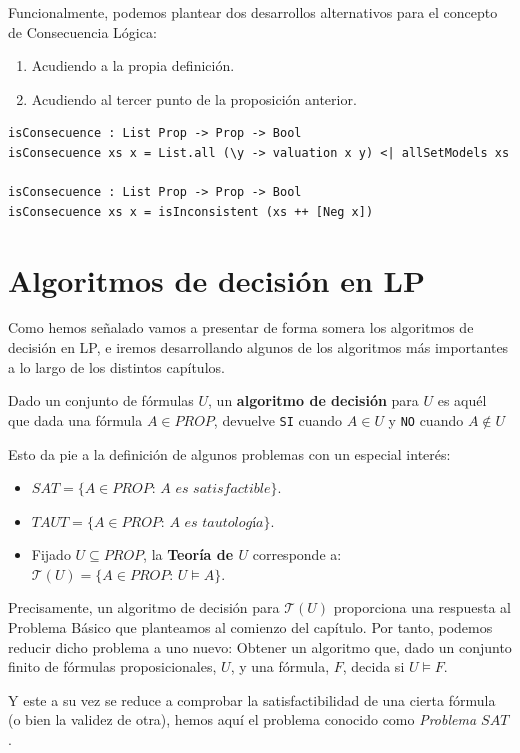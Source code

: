\documentclass[a4paper]{report}
\begin{document}
Funcionalmente, podemos plantear dos desarrollos alternativos para el concepto de Consecuencia Lógica:
\begin{enumerate}
\setlength{\leftskip}{0.5cm}
\item Acudiendo a la propia definición.
\item Acudiendo al tercer punto de la proposición anterior.
\end{enumerate}

\begin{lstlisting}[caption={Consecuencia Lógica}]
isConsecuence : List Prop -> Prop -> Bool
isConsecuence xs x = List.all (\y -> valuation x y) <| allSetModels xs

isConsecuence : List Prop -> Prop -> Bool
isConsecuence xs x = isInconsistent (xs ++ [Neg x])
\end{lstlisting}

\section{Algoritmos de decisión en LP}

Como hemos señalado vamos a presentar de forma somera los algoritmos de decisión en LP, e iremos desarrollando algunos de los algoritmos más importantes a lo largo de los distintos capítulos.

Dado un conjunto de fórmulas $U$, un \textbf{algoritmo de decisión} para $U$ es aquél que dada una fórmula $A \in PROP$, devuelve \texttt{SI} cuando $A \in U$ y \texttt{NO} cuando $A \not\in U$

Esto da pie a la definición de algunos problemas con un especial interés:
\begin{itemize}
\item $SAT = \{A \in PROP: \, A \textit{ es satisfactible}\}$.
\item $TAUT = \{A \in PROP: \, A \textit{ es tautología}\}$.
\item Fijado $U \subseteq PROP$, la \textbf{Teoría de $U$} corresponde a: $\mathcal{T}(U) = \{A \in PROP: \, U \models A\}$. 
\end{itemize}

Precisamente, un algoritmo de decisión para $\mathcal{T}(U)$ proporciona una respuesta al Problema Básico que planteamos al comienzo del capítulo. Por tanto, podemos reducir dicho problema a uno nuevo: Obtener un algoritmo que, dado un conjunto finito de fórmulas proposicionales, $U$, y una fórmula, $F$, decida si $U \models F$.

Y este a su vez se reduce a comprobar la satisfactibilidad de una cierta fórmula (o bien la validez de otra), hemos aquí el problema conocido como \textit{Problema $SAT$}. 
\end{document}

